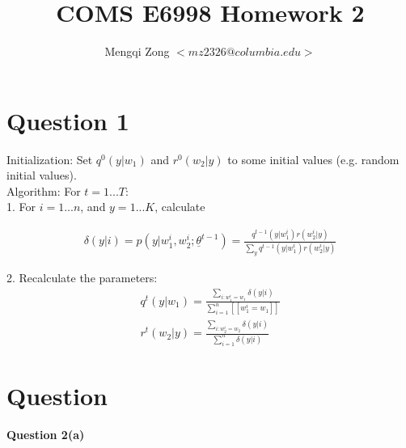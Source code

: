 \documentclass[12pt]{article}
\title{COMS E6998 Homework 2}
\author{Mengqi Zong $<mz2326@columbia.edu>$}
\begin{document}
\maketitle

\setlength{\parindent}{0in}

\section*{Question 1}

Initialization: Set $q^0(y|w_1)$ and $r^0(w_2|y)$ to some initial
values (e.g. random initial values). \\

Algorithm: For $t = 1...T$: \\

1. For $i = 1...n$, and $y = 1...K$, calculate

\begin{eqnarray*}
\delta(y|i)
= p(y|w^i_1, w^i_2; \underline {\theta}^{t-1})
= \frac {q^{t-1}(y|w^i_1) r(w^i_2|y)}
{\sum_y {q^{t-1}(y|w^i_1) r(w^i_2|y)}}
\end{eqnarray*}

2. Recalculate the parameters: \\

\begin{eqnarray*}
q^t(y|w_1) = \frac {\sum_{i:w^i_1 = w_1} \delta (y|i)}
{\sum^n_{i=1} [[w^i_1 = w_1]]} \\
r^t(w_2|y) = \frac {\sum_{i:w^i_2 = w_2} \delta (y|i)}
{\sum^n_{i=1} \delta (y|i)}
\end{eqnarray*}

\section*{Question}

\bf {Question 2(a)} \\
\end{document}
